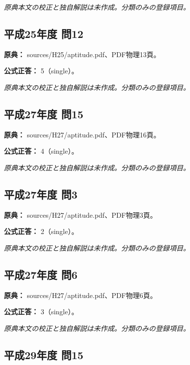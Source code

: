 \par\textit{原典本文の校正と独自解説は未作成。分類のみの登録項目。}

\subsection{平成25年度 問12}
\label{q:h25-reg-apt-12}

\noindent\textbf{原典：} sources/H25/aptitude.pdf、PDF物理13頁。

\textbf{公式正答：} 5（single）。

\par\textit{原典本文の校正と独自解説は未作成。分類のみの登録項目。}

\subsection{平成27年度 問15}
\label{q:h27-reg-apt-15}

\noindent\textbf{原典：} sources/H27/aptitude.pdf、PDF物理16頁。

\textbf{公式正答：} 4（single）。

\par\textit{原典本文の校正と独自解説は未作成。分類のみの登録項目。}

\subsection{平成27年度 問3}
\label{q:h27-reg-apt-03}

\noindent\textbf{原典：} sources/H27/aptitude.pdf、PDF物理3頁。

\textbf{公式正答：} 2（single）。

\par\textit{原典本文の校正と独自解説は未作成。分類のみの登録項目。}

\subsection{平成27年度 問6}
\label{q:h27-reg-apt-06}

\noindent\textbf{原典：} sources/H27/aptitude.pdf、PDF物理6頁。

\textbf{公式正答：} 3（single）。

\par\textit{原典本文の校正と独自解説は未作成。分類のみの登録項目。}

\subsection{平成29年度 問15}
\label{q:h29-reg-apt-15}

